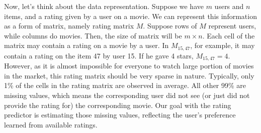 \documentclass[12pt]{article}
\begin{document}
Now, let's think about the data representation. Suppose we have $m$
users and $n$ items, and a rating given by a user on a movie. We can
represent this information as a form of matrix, namely rating matrix
$M$. Suppose rows of $M$ represent users, while columns do movies.
Then, the size of matrix will be $m \times n$. Each cell of the
matrix may contain a rating on a movie by a user. In $M_{15,47}$,
for example, it may contain a rating on the item 47 by user 15. If
he gave 4 stars, $M_{15,47} = 4$. However, as it is almost
impossible for everyone to watch large portion of movies in the
market, this rating matrix should be very sparse in nature.
Typically, only 1\% of the cells in the rating matrix are observed
in average. All other 99\% are missing values, which means the
corresponding user did not see (or just did not provide the rating
for) the corresponding movie. Our goal with the rating predictor is
estimating those missing values, reflecting the user's preference
learned from available ratings.
\end{document}

